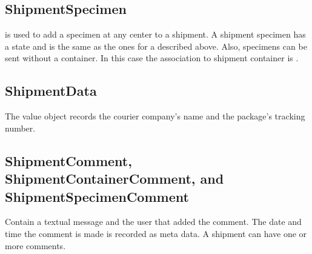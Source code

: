 \subsection*{ShipmentSpecimen}
 is used to add a specimen at any center to a
shipment.  A shipment specimen has a state and is the same as the ones for a
 described above. Also, specimens can be sent
without a container. In this case the association to shipment container is
.

\subsection*{ShipmentData}
The  value object records the courier company's name
and the package's tracking number.

\subsection*{ShipmentComment, ShipmentContainerComment, and
  ShipmentSpecimenComment}
\hypertarget{ShipmentComment}{}
\hypertarget{ShipmentContainerComment}{}
\hypertarget{ShipmentSpecimenComment}{}

Contain a textual message and the user that added the comment. The date and
time the comment is made is recorded as meta data. A shipment can have one or
more comments.

